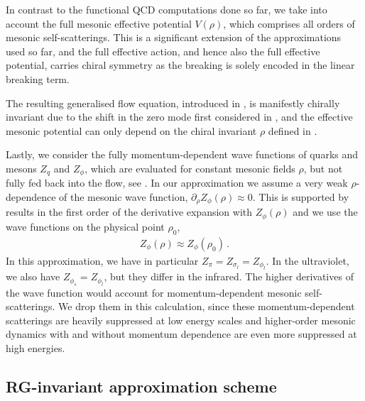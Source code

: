 \documentclass[aps,twocolumn,prd,superscriptaddress]{revtex4-2}
\begin{document}
In contrast to the functional QCD computations done so far, we take into account the full mesonic effective potential $V(\rho)$, which comprises all orders of mesonic self-scatterings. This is a significant extension of the approximations used so far, and the full effective action, and hence also the full effective potential, carries chiral symmetry as the breaking is solely encoded in the linear breaking term. 

The resulting generalised flow equation, introduced in , is manifestly chirally invariant due to the shift in the zero mode first considered in \cite{Fu:2019hdw}, and the effective mesonic potential can only depend on the chiral invariant $\rho$ defined in . 

Lastly, we consider the fully momentum-dependent wave functions of quarks and mesons $Z_q$ and $Z_\phi$, which are evaluated for constant mesonic fields $\rho$, but not fully fed back into the flow, see . In our approximation we assume a very weak $\rho$-dependence of the mesonic wave function, $\partial_\rho Z_\phi(\rho) \approx 0$. This is supported by results in the first order of the derivative expansion with $Z_\phi(\rho)$ and we use the wave functions on the physical point $\rho_0$, 
%
\begin{align}
Z_\phi(\rho) \approx Z_\phi(\rho_0) \,.
\end{align}
%
In this approximation, we have in particular $Z_{\pi} = Z_{\sigma_l}=Z_{\phi_l}$. In the ultraviolet, we also have $Z_{\phi_s} =Z_{\phi_l}$, but they differ in the infrared. The higher derivatives of the wave function would account for momentum-dependent mesonic self-scatterings. We drop them in this calculation, since these momentum-dependent scatterings are heavily suppressed at low energy scales and higher-order mesonic dynamics with and without momentum dependence are even more suppressed at high energies.


\subsection{RG-invariant approximation scheme}
\label{sec:RG-invariant expansion}
\end{document}
